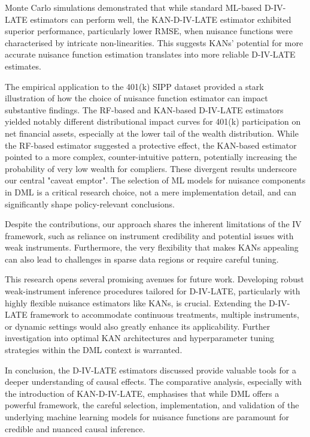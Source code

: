 \documentclass[final,3p,fleqn, 10pt]{elsarticle}
\begin{document}
Monte Carlo simulations demonstrated that while standard ML-based D-IV-LATE estimators can perform well, the KAN-D-IV-LATE estimator exhibited superior performance, particularly lower RMSE, when nuisance functions were characterised by intricate non-linearities. This suggests KANs' potential for more accurate nuisance function estimation translates into more reliable D-IV-LATE estimates.

The empirical application to the 401(k) SIPP dataset provided a stark illustration of how the choice of nuisance function estimator can impact substantive findings. The RF-based and KAN-based D-IV-LATE estimators yielded notably different distributional impact curves for 401(k) participation on net financial assets, especially at the lower tail of the wealth distribution. While the RF-based estimator suggested a protective effect, the KAN-based estimator pointed to a more complex, counter-intuitive pattern, potentially increasing the probability of very low wealth for compliers. These divergent results underscore our central "caveat emptor". The selection of ML models for nuisance components in DML is a critical research choice, not a mere implementation detail, and can significantly shape policy-relevant conclusions.

Despite the contributions, our approach shares the inherent limitations of the IV framework, such as reliance on instrument credibility and potential issues with weak instruments. Furthermore, the very flexibility that makes KANs appealing can also lead to challenges in sparse data regions or require careful tuning.

This research opens several promising avenues for future work. Developing robust weak-instrument inference procedures tailored for D-IV-LATE, particularly with highly flexible nuisance estimators like KANs, is crucial. Extending the D-IV-LATE framework to accommodate continuous treatments, multiple instruments, or dynamic settings would also greatly enhance its applicability. Further investigation into optimal KAN architectures and hyperparameter tuning strategies within the DML context is warranted.

In conclusion, the D-IV-LATE estimators discussed provide valuable tools for a deeper understanding of causal effects. The comparative analysis, especially with the introduction of KAN-D-IV-LATE, emphasises that while DML offers a powerful framework, the careful selection, implementation, and validation of the underlying machine learning models for nuisance functions are paramount for credible and nuanced causal inference.
\end{document}
